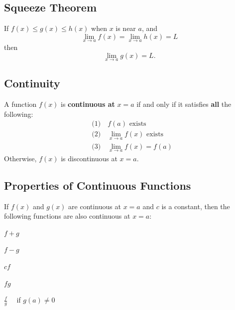\documentclass[a4paper,11pt]{article}
\theoremstyle{definition}
\theoremstyle{plain}
\theoremstyle{remark}
\begin{document}


\subsection{Squeeze Theorem}

\begin{tcolorbox}
    If \( f(x) \leq g(x) \leq h(x) \) when \( x \) is near \( a \), and
    \[ \lim\limits_{x \to a} f(x) = \lim\limits_{x \to a} h(x) = L \] then
    \[\lim\limits_{x \to a} g(x) = L.\]
\end{tcolorbox}




\subsection{Continuity}

\begin{tcolorbox}
    A function \( f(x) \) is \textbf{continuous at} \( x = a \) if and only if it satisfies \textbf{all} the following:
    \[
    \begin{aligned}
        &\text{(1)} \quad f(a) \text{ exists} \\  
        &\text{(2)} \quad \lim\limits_{x \to a} f(x) \text{ exists} \\  
        &\text{(3)} \quad \lim\limits_{x \to a} f(x) = f(a)  
    \end{aligned}
    \]
    Otherwise, \( f(x) \) is discontinuous at \( x = a \).
\end{tcolorbox}




\subsection{Properties of Continuous Functions}


\begin{tcolorbox}
    If \( f(x) \) and \( g(x) \) are continuous at \( x = a \) and \( c \) is a constant, then the following functions are also continuous at \( x = a \):  
    \begin{enumerate}
        \begin{multicols}{3}
            \item \(f + g\)
            \item \(f - g\)
            \item \(cf\)
        \end{multicols}
        \begin{multicols}{3}
            \item \(fg\)
            \item \(\displaystyle \frac{f}{g} \quad \) if \( g(a) \neq 0\)
        \end{multicols}
    \end{enumerate}
\end{tcolorbox}
\end{document}
